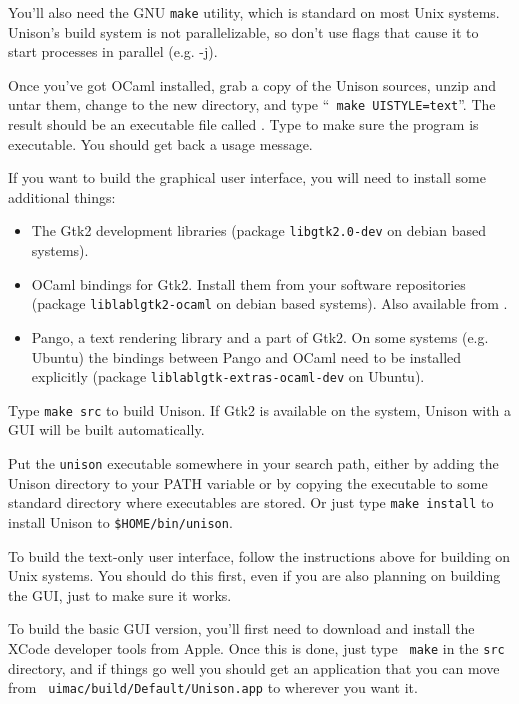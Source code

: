 \documentclass{article}
\begin{document}
You'll also need the GNU {\tt make} utility, which is standard on most Unix
systems.  Unison's build system is not parallelizable, so don't use flags
that cause it to start processes in parallel (e.g. -j).

Once you've got OCaml installed, grab a copy of the Unison sources, unzip
and untar them, change to the new  directory, and type ``{\tt
  make UISTYLE=text}''.  The result should be an executable file called
.  Type  to make sure the program is
executable.  You should get back a usage message.

If you want to build the graphical user interface, you will need to install
some additional things:
\begin{itemize}
\item The Gtk2 development libraries (package {\tt libgtk2.0-dev} on debian
based systems).
\item OCaml bindings for Gtk2. Install them from your software repositories
(package {\tt liblablgtk2-ocaml} on debian based systems). Also available
from .
\item Pango, a text rendering library and a part of Gtk2. On some systems
(e.g. Ubuntu) the bindings between Pango and OCaml need to be installed
explicitly (package {\tt liblablgtk-extras-ocaml-dev} on Ubuntu).
\end{itemize}
Type {\tt make src} to build Unison. If Gtk2 is available on the system,
Unison with a GUI will be built automatically.

Put the \verb|unison| executable somewhere in your search path, either by
adding the Unison directory to your PATH variable or by copying the
executable to some standard directory where executables are stored.  Or just
type {\tt make install} to install Unison to {\tt \$HOME/bin/unison}.


To build the text-only user interface, follow the instructions above for
building on Unix systems.  You should do this first, even if you are also
planning on building the GUI, just to make sure it works.

To build the basic GUI version, you'll first need to download and install
the XCode developer tools from Apple.  Once this is done, just type {\tt
  make} in the {\tt src} directory, and if things go well you
should get an application that you can move from {\tt
  uimac/build/Default/Unison.app} to wherever you want it.
\end{document}
